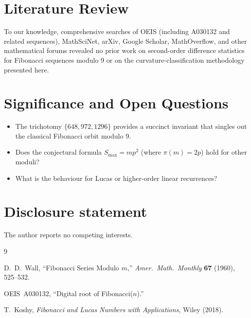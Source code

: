 \documentclass[12pt]{article}
\begin{document}
\section{Literature Review}

To our knowledge, comprehensive searches of OEIS (including A030132 and related
sequences), MathSciNet, arXiv, Google Scholar, MathOverflow, and other
mathematical forums revealed no prior work on second-order difference statistics
for Fibonacci sequences modulo 9 or on the curvature-classification methodology
presented here.

\section{Significance and Open Questions}

\begin{itemize}
\item The trichotomy $\{648,972,1296\}$ provides a succinct invariant that
      singles out the classical Fibonacci orbit modulo 9.
\item Does the conjectural formula $S_{\max}=mp^{2}$ (where $\pi(m)=2p$) hold
      for other moduli?
\item What is the behaviour for Lucas or higher-order linear recurrences?
\end{itemize}

\section*{Disclosure statement}
\noindent The author reports no competing interests.

\begin{thebibliography}{9}

D.~D.~Wall,
``Fibonacci Series Modulo $m$,''
\textit{Amer.\ Math.\ Monthly} \textbf{67} (1960), 525--532.

OEIS~A030132, ``Digital root of Fibonacci($n$).''

T.~Koshy,
\textit{Fibonacci and Lucas Numbers with Applications},
Wiley (2018).

\end{thebibliography}
\end{document}
